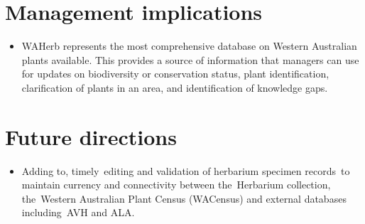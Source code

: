 \documentclass[version=last,
    paper=a4, %
    10pt, %
    usenames,
    dvipsnames,
    oneside, %
    headings=openany, %
    DIV=15 %
]{scrbook}
\begin{document}
\section*{Management implications}

\begin{itemize}
\itemsep1pt\parskip0pt
\item
  WAHerb represents the most comprehensive database on Western
  Australian plants available. This provides a source of information
  that managers can use for updates on biodiversity or conservation
  status, plant identification, clarification of plants in an area, and
  identification of knowledge gaps.
\end{itemize}




\section*{Future directions}

\begin{itemize}
\itemsep1pt\parskip0pt
\item
  Adding to, timely~editing and validation of herbarium specimen
  records~to maintain currency and connectivity between the~Herbarium
  collection, the~Western Australian Plant Census (WACensus) and
  external databases including~AVH and ALA.~
\end{itemize}



\end{document}
